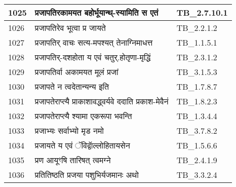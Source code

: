 \documentclass[17pt]{extarticle}
\begin{document}
\begin{longtable}{||p{0.4in}||p{4.9in}||p{0.9in}||}
    \hline
        
    1025 & प्रजापतिरकामयत बहोर्भूयान्थ्{-}स्यामिति स एतं & TB\_2.7.10.1       \\
    
    \hline
        
    1026 & प्रजापतिरेव भूत्वा प्र जायते & TB\_2.2.1.2       \\
    
    \hline
        
    1027 & प्रजापतिर् वाचः सत्य{-}मपश्यत् तेनाग्निमाधत्त & TB\_1.1.5.1       \\
    
    \hline
        
    1028 & प्रजापतिर्{-}दशहोता य एवं चतुर्.होतृणा{-}मृद्धिं & TB\_2.3.1.2       \\
    
    \hline
        
    1029 & प्रजापतिर्वा अकामयत मूलं प्रजां & TB\_3.1.5.3       \\
    
    \hline
        
    1030 & प्रजापते न त्वदेतान्यन्य इति & TB\_1.7.8.7       \\
    
    \hline
        
    1031 & प्रजापतेराप्त्यै प्राकाशावद्ध्वर्यवे ददाति प्रकाश{-}मेवैनं & TB\_1.8.2.3       \\
    
    \hline
        
    1032 & प्रजापतेराप्त्यै श्यामा एकरूपा भवन्ति & TB\_1.3.4.4       \\
    
    \hline
        
    1033 & प्रजाभ्यः सर्वाभ्यो मृड नमो & TB\_3.7.8.2       \\
    
    \hline
        
    1034 & प्रजायते य एवं ॅविद्वाॅल्लोहितायसेन & TB\_1.5.6.6       \\
    
    \hline
        
    1035 & प्रण आयूꣳषि तारिषत् त्वमग्ने & TB\_2.4.1.9       \\
    
    \hline
        
    1036 & प्रतितिष्ठति प्रजया पशुभिर्यजमानः अथो & TB\_3.3.2.4       \\
    

\end{longtable}
\end{document}

